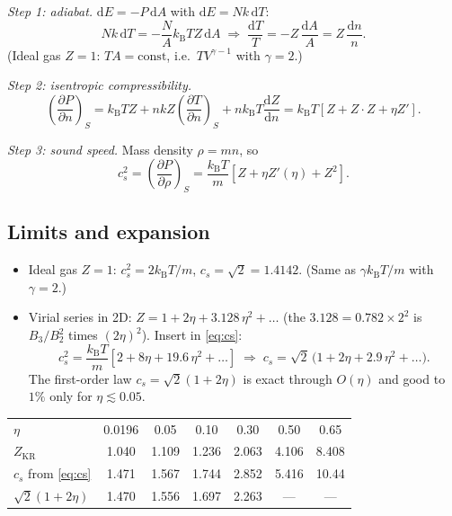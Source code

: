 \documentclass[11pt,a4paper]{article}
\newcommand{\kT}{k_{\mathrm B}T}
\newcommand{\ie}{i.e.\ }
\newcommand{\dd}{\mathrm{d}}
\begin{document}
\emph{Step 1: adiabat.} $\dd E = -P\,\dd A$ with $\dd E = Nk\,\dd T$:
\begin{equation}
Nk\,\dd T = -\frac{N}{A}\kT Z\,\dd A
\;\Longrightarrow\;
\frac{\dd T}{T} = -Z\,\frac{\dd A}{A} = Z\,\frac{\dd n}{n}.
\label{eq:adiabat}
\end{equation}
(Ideal gas $Z = 1$: $T A = \text{const}$, \ie $TV^{\gamma-1}$ with $\gamma = 2$.)

\emph{Step 2: isentropic compressibility.}
\begin{equation}
\left(\frac{\partial P}{\partial n}\right)_S
= \kT Z + n k Z \left(\frac{\partial T}{\partial n}\right)_S + n\kT\frac{\dd Z}{\dd n}
= \kT\left[Z + Z\cdot Z + \eta Z'\right].
\end{equation}

\emph{Step 3: sound speed.} Mass density $\rho = m n$, so
\begin{equation}
\boxed{\;c_s^2 = \left(\frac{\partial P}{\partial\rho}\right)_S = \frac{\kT}{m}\left[Z + \eta Z'(\eta) + Z^2\right].\;}
\label{eq:cs}
\end{equation}

\subsection{Limits and expansion}
\begin{itemize}[nosep]
\item Ideal gas $Z = 1$: $c_s^2 = 2\kT/m$, $c_s = \sqrt2 = 1.4142$. (Same as $\gamma\kT/m$ with $\gamma = 2$.)
\item Virial series in 2D: $Z = 1 + 2\eta + 3.128\,\eta^2 + \ldots$ (the $3.128 = 0.782\times2^2$ is $B_3/B_2^2$ times $(2\eta)^2$). Insert in \eqref{eq:cs}:
\begin{equation}
c_s^2 = \frac{\kT}{m}\left[2 + 8\eta + 19.6\,\eta^2 + \ldots\right]
\;\Longrightarrow\;
c_s = \sqrt2\,\bigl(1 + 2\eta + 2.9\,\eta^2 + \ldots\bigr).
\label{eq:cs_expansion}
\end{equation}
The first-order law $c_s = \sqrt2(1+2\eta)$ is exact through $O(\eta)$ and good to $1\%$ only for $\eta \lesssim 0.05$.
\end{itemize}

\begin{worked}
\begin{tabular}{@{}lcccccc@{}}
\toprule
$\eta$ & 0.0196 & 0.05 & 0.10 & 0.30 & 0.50 & 0.65\\
$Z_{\mathrm{KR}}$ & 1.040 & 1.109 & 1.236 & 2.063 & 4.106 & 8.408\\
$c_s$ from \eqref{eq:cs} & 1.471 & 1.567 & 1.744 & 2.852 & 5.416 & 10.44\\
$\sqrt2(1+2\eta)$ & 1.470 & 1.556 & 1.697 & 2.263 & --- & ---\\
\bottomrule
\end{tabular}
\end{worked}
\end{document}
